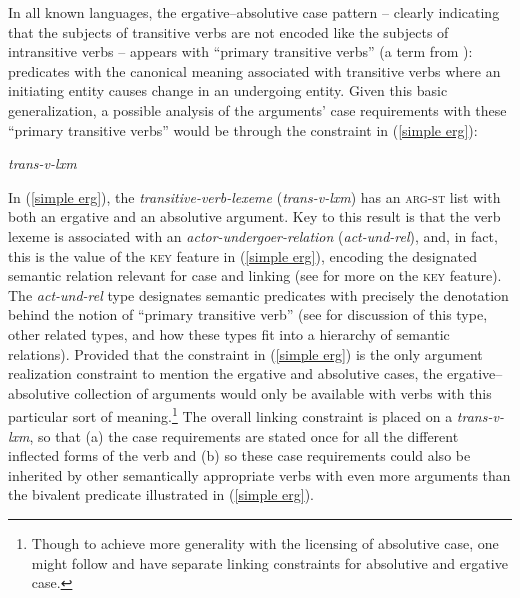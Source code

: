 \documentclass[output=paper
	        ,collection
	        ,collectionchapter
 	        ,biblatex
                ,babelshorthands
                ,newtxmath
                ,draftmode
                ,colorlinks, citecolor=brown
]{langscibook}
\begin{document}
In all known  languages, the ergative--absolutive case pattern -- clearly indicating that the subjects of transitive verbs are not encoded like the subjects of intransitive verbs -- appears with ``primary transitive verbs'' (a term from \citealt{andrews85,andrews072nded}): predicates with the canonical meaning associated with transitive verbs where an initiating entity causes change in an undergoing entity. Given this basic generalization, a possible analysis of the arguments' case requirements with these ``primary transitive verbs'' would be through the constraint in (\ref{simple erg}):
%
\begin{exe}
\ex\label{simple erg}
\emph{trans-v-lxm} \impl 
{}
\end{exe}
%
In (\ref{simple erg}), the \textit{transitive-verb-lexeme} (\textit{trans-v-lxm}) has an \textsc{arg-st} list with both an ergative and an absolutive argument. Key to this result is that the verb lexeme is associated with an \textit{actor-undergoer-relation} (\textit{act-und-rel}), and, in fact, this is the value of the \textsc{key} feature in (\ref{simple erg}), encoding the designated semantic relation relevant for case and linking (see \citealt{KD2006a-u} for more on the \textsc{key} feature). The \textit{act-und-rel} type designates semantic predicates with precisely the denotation behind the notion of ``primary transitive verb'' (see \citealt[75--134]{Davis2001a-u} for discussion of this type, other related types, and how these types fit into a hierarchy of semantic relations). Provided that the constraint in (\ref{simple erg}) is the only argument realization constraint to mention the ergative and absolutive cases, the ergative--absolutive collection of arguments would only be available with verbs with this particular sort of meaning.\footnote{Though to achieve more generality with the licensing of absolutive case, one might follow \citet[Chapter 7]{ball08thesis} and have separate linking constraints for absolutive and ergative case.} The overall linking constraint is placed on a \textit{trans-v-lxm}, so that (a) the case requirements are stated once for all the different inflected forms of the verb and (b) so these case requirements could also be inherited by other semantically appropriate verbs with even more arguments than the bivalent predicate illustrated in (\ref{simple erg}).     
\end{document}

